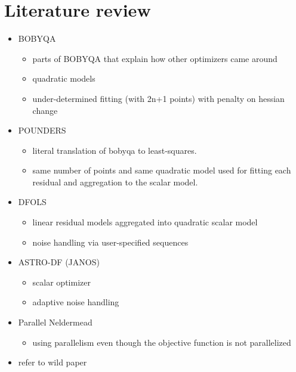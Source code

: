\section{Literature review}
\begin{itemize}
    \item BOBYQA
        \begin{itemize}
            \item parts of BOBYQA that explain how other optimizers came around
            \item quadratic models
            \item under-determined fitting (with 2n+1 points) with penalty on hessian change
        \end{itemize}
        \item POUNDERS
            \begin{itemize}
                \item literal translation of bobyqa to least-squares.
                \item same number of points and same quadratic model used for fitting each residual and aggregation to the scalar model.
            \end{itemize}
        \item DFOLS
            \begin{itemize}
                \item linear residual models aggregated into quadratic scalar model
                \item noise handling via user-specified sequences
            \end{itemize}
    \item ASTRO-DF (JANOS)
            \begin{itemize}
                \item scalar optimizer
                \item adaptive noise handling
            \end{itemize}
    \item Parallel Neldermead
            \begin{itemize}
                \item using parallelism even though the objective function is not parallelized
            \end{itemize}
    \item refer to wild paper
\end{itemize}





